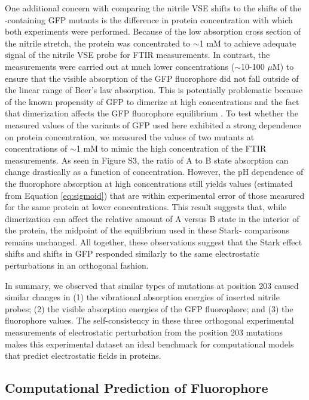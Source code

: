 One additional concern with comparing the nitrile VSE shifts to the \pKa{} shifts of the \pCNF{}-containing GFP mutants is the difference in protein concentration with which both experiments were performed.
Because of the low absorption cross section of the nitrile stretch, the protein was concentrated to $\sim$1 mM to achieve adequate signal of the nitrile VSE probe for FTIR measurements. 
In contrast, the \pKa{} measurements were carried out at much lower concentrations ($\sim$10-100 $\mu$M) to ensure that the visible absorption of the GFP fluorophore did not fall outside of the linear range of Beer's law absorption.
This is potentially problematic because of the known propensity of GFP to dimerize at high concentrations and the fact that dimerization affects the GFP fluorophore equilibrium \cite{Tsien1998}.
To test whether the measured \pKa{} values of the variants of GFP used here exhibited a strong dependence on protein concentration, we measured the \pKa{} values of two mutants at concentrations of $\sim$1 mM to mimic the high concentration of the FTIR measurements.
As seen in Figure S3, the ratio of A to B state absorption can change drastically as a function of concentration.
However, the pH dependence of the fluorophore absorption at high concentrations still yields \pKa{} values (estimated from Equation \ref{eq:sigmoid}) that are within experimental error of those measured for the same protein at lower concentrations.
This result suggests that, while dimerization can affect the relative amount of A versus B state in the interior of the protein, the midpoint of the equilibrium used in these Stark-\pKa{} comparisons remains unchanged.
All together, these observations suggest that the Stark effect shifts and \pKa{} shifts in GFP responded similarly to the same electrostatic perturbations in an orthogonal fashion.

In summary, we observed that similar types of mutations at position 203 caused similar changes in (1) the vibrational absorption energies of inserted nitrile probes; (2) the visible absorption energies of the GFP fluorophore; and (3) the fluorophore \pKa{} values.
The self-consistency in these three orthogonal experimental measurements of electrostatic perturbation from the position 203 mutations makes this experimental dataset an ideal benchmark for computational models that predict electrostatic fields in proteins.

\subsection{Computational Prediction of Fluorophore \pKa{} }

